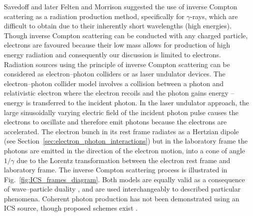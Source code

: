 \documentclass[../main.tex]{subfiles}
\begin{document}
Savedoff \cite{savedoff1959crab} and later Felten and Morrison \cite{felten1963recoil} suggested the use of inverse Compton scattering as a radiation production method, specifically for $\gamma$-rays, which are difficult to obtain due to their inherently short wavelengths (high energies). Though inverse Compton scattering can be conducted with any charged particle, electrons are favoured because their low mass allows for production of high energy radiation and consequently our discussion is limited to electrons. Radiation sources using the principle of inverse Compton scattering can be considered as electron--photon colliders or as laser undulator devices. The electron--photon collider model involves a collision between a photon and relativistic electron where the electron recoils and the photon gains energy -- energy is transferred to the incident photon. In the laser undulator approach, the large sinusoidally varying electric field of the incident photon pulse causes the electrons to oscillate and therefore emit photons because the electrons are accelerated. The electron bunch in its rest frame radiates as a Hertzian dipole (see Section~\ref{sec:electron_photon_interactions}) but in the laboratory frame the photons are emitted in the direction of the electron motion, into a cone of angle $1/\gamma$ due to the Lorentz transformation between the electron rest frame and laboratory frame. The inverse Compton scattering process is illustrated in Fig.~\ref{fig:ICS_frames_diagram}. Both models are equally valid as a consequence of wave--particle duality \cite{de1923waves}, and are used interchangeably to described particular phenomena. Coherent photon production has not been demonstrated using an ICS source, though proposed schemes exist \cite{graves2012intense,graves2014compact,nanni2018nanomodulated}.
\end{document}
